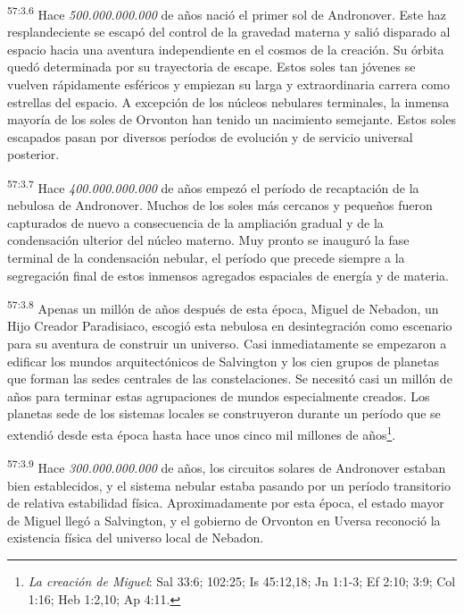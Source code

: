 \par
\textsuperscript{57:3.6} Hace \textit{500.000.000.000} de años nació el primer sol de Andronover. Este haz resplandeciente se escapó del control de la gravedad materna y salió disparado al espacio hacia una aventura independiente en el cosmos de la creación. Su órbita quedó determinada por su trayectoria de escape. Estos soles tan jóvenes se vuelven rápidamente esféricos y empiezan su larga y extraordinaria carrera como estrellas del espacio. A excepción de los núcleos nebulares terminales, la inmensa mayoría de los soles de Orvonton han tenido un nacimiento semejante. Estos soles escapados pasan por diversos períodos de evolución y de servicio universal posterior.

\par
\textsuperscript{57:3.7} Hace \textit{400.000.000.000} de años empezó el período de recaptación de la nebulosa de Andronover. Muchos de los soles más cercanos y pequeños fueron capturados de nuevo a consecuencia de la ampliación gradual y de la condensación ulterior del núcleo materno. Muy pronto se inauguró la fase terminal de la condensación nebular, el período que precede siempre a la segregación final de estos inmensos agregados espaciales de energía y de materia.

\par
\textsuperscript{57:3.8} Apenas un millón de años después de esta época, Miguel de Nebadon, un Hijo Creador Paradisiaco, escogió esta nebulosa en desintegración como escenario para su aventura de construir un universo. Casi inmediatamente se empezaron a edificar los mundos arquitectónicos de Salvington y los cien grupos de planetas que forman las sedes centrales de las constelaciones. Se necesitó casi un millón de años para terminar estas agrupaciones de mundos especialmente creados. Los planetas sede de los sistemas locales se construyeron durante un período que se extendió desde esta época hasta hace unos cinco mil millones de años\footnote{\textit{La creación de Miguel}: Sal 33:6; 102:25; Is 45:12,18; Jn 1:1-3; Ef 2:10; 3:9; Col 1:16; Heb 1:2,10; Ap 4:11.}.

\par
\textsuperscript{57:3.9} Hace \textit{300.000.000.000} de años, los circuitos solares de Andronover estaban bien establecidos, y el sistema nebular estaba pasando por un período transitorio de relativa estabilidad física. Aproximadamente por esta época, el estado mayor de Miguel llegó a Salvington, y el gobierno de Orvonton en Uversa reconoció la existencia física del universo local de Nebadon.

